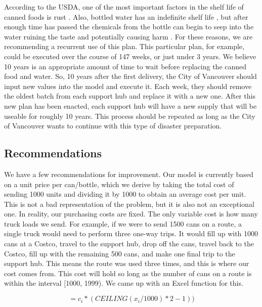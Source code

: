 \documentclass{article}
\begin{document}
According to the USDA, one of the most important factors in the shelf life of canned foods is rust \cite{can life}. Also, bottled water has an indefinite shelf life \cite{bottledwaterindef}, but after enough time has passed the chemicals from the bottle can begin to seep into the water ruining the taste and potentially causing harm \cite{bottledwaterexp}. For these reasons, we are recommending a recurrent use of this plan. This particular plan, for example, could be executed over the course of 147 weeks, or just under 3 years. We believe 10 years is an appropriate amount of time to wait before replacing the canned food and water. So, 10 years after the first delivery, the City of Vancouver should input new values into the model and execute it. Each week, they should remove the oldest batch from each support hub and replace it with a new one. After this new plan has been enacted, each support hub will have a new supply that will be useable for roughly 10 years. This process should be repeated as long as the City of Vancouver wants to continue with this type of disaster preparation.

\subsection{Recommendations}

We have a few recommendations for improvement. Our model is currently based on a unit price per can/bottle, which we derive by taking the total cost of sending 1000 units and dividing it by 1000 to obtain an average cost per unit. This is not a bad representation of the problem, but it is also not an exceptional one. In reality, our purchasing costs are fixed. The only variable cost is how many truck loads we send. For example, if we were to send 1500 cans on a route, a single truck would need to perform three one-way trips. It would fill up with 1000 cans at a Costco, travel to the support hub, drop off the cans, travel back to the Costco, fill up with the remaining 500 cans, and make one final trip to the support hub. This means the route was used three times, and this is where our cost comes from. This cost will hold so long as the number of cans on a route is within the interval [1000, 1999). We came up with an Excel function for this.

\[=c_i*(CEILING(x_i/1000)*2-1))\]
\end{document}
